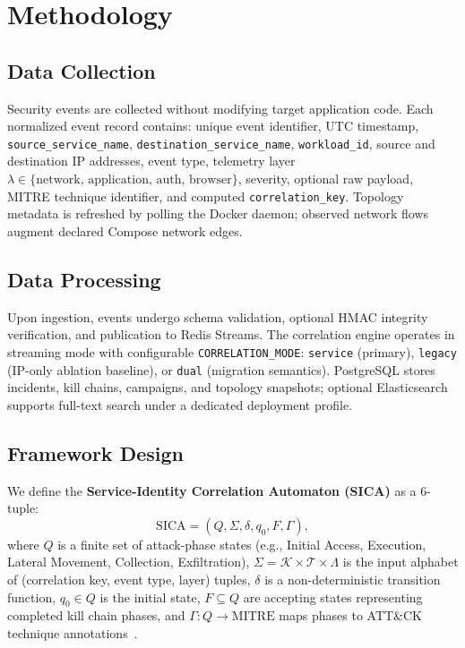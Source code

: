 \documentclass[conference]{IEEEtran}
\begin{document}
\section{Methodology}
\label{sec:methodology}

\subsection{Data Collection}
Security events are collected without modifying target application code.
Each normalized event record contains: unique event identifier, UTC
timestamp, \texttt{source\_service\_name}, \texttt{destination\_service\_name},
\texttt{workload\_id}, source and destination IP addresses, event type,
telemetry layer $\lambda \in \{\text{network, application, auth, browser}\}$,
severity, optional raw payload, MITRE technique identifier, and computed
\texttt{correlation\_key}. Topology metadata is refreshed by polling the
Docker daemon; observed network flows augment declared Compose network
edges.

\subsection{Data Processing}
Upon ingestion, events undergo schema validation, optional HMAC integrity
verification, and publication to Redis Streams. The correlation engine
operates in streaming mode with configurable \texttt{CORRELATION\_MODE}:
\texttt{service} (primary), \texttt{legacy} (IP-only ablation baseline), or
\texttt{dual} (migration semantics). PostgreSQL stores incidents, kill
chains, campaigns, and topology snapshots; optional Elasticsearch supports
full-text search under a dedicated deployment profile.

\subsection{Framework Design}
We define the \textbf{Service-Identity Correlation Automaton (SICA)} as a
6-tuple:
\begin{equation}
\text{SICA} = (Q, \Sigma, \delta, q_0, F, \Gamma),
\label{eq:sica}
\end{equation}
where $Q$ is a finite set of attack-phase states (e.g., Initial Access,
Execution, Lateral Movement, Collection, Exfiltration), $\Sigma = \mathcal{K}
\times \mathcal{T} \times \Lambda$ is the input alphabet of (correlation
key, event type, layer) tuples, $\delta$ is a non-deterministic transition
function, $q_0 \in Q$ is the initial state, $F \subseteq Q$ are accepting
states representing completed kill chain phases, and $\Gamma: Q \rightarrow
\text{MITRE}$ maps phases to ATT\&CK technique annotations~\cite{strom2018attack}.
\end{document}
